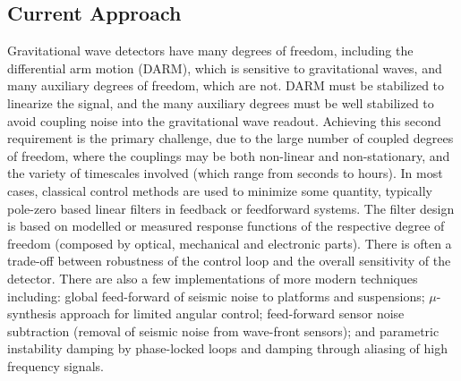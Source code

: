 \subsection{Current Approach}
Gravitational wave detectors have many degrees of freedom,  including the differential arm motion (DARM), which is sensitive to gravitational waves, and many auxiliary degrees of freedom, which are not. DARM must be stabilized to linearize the signal, and the many auxiliary degrees must be well stabilized to avoid coupling noise into the gravitational wave readout. Achieving this second requirement is the primary challenge, due to the large number of coupled degrees of freedom, where the couplings may be both non-linear and non-stationary, and the variety of timescales involved (which range from seconds to hours).
In most cases, classical control methods are used to minimize some quantity, typically pole-zero based linear filters in feedback or feedforward systems.
The filter design is based on modelled or measured response functions of the respective degree of freedom (composed by optical, mechanical and electronic parts). There is often a trade-off between robustness of the control loop and the overall sensitivity of the detector.
There are also a few implementations of more modern techniques including:
global feed-forward of seismic noise to platforms and suspensions; $\mu$-synthesis approach for limited angular control; feed-forward sensor noise subtraction (removal of seismic noise from wave-front sensors); and parametric instability damping by phase-locked loops and damping through aliasing of high frequency signals.

